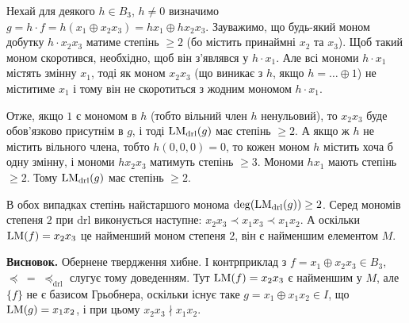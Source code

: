 Нехай для деякого $h \in B_3$, $h \neq 0$ визначимо $g = h \cdot f = h(x_1 \oplus x_2 x_3) = h x_1 \oplus h x_2 x_3$. 
Зауважимо, що будь-який моном добутку $h \cdot x_2 x_3$ матиме степінь $\geq 2$ (бо містить принаймні $x_2$ та $x_3$). 
Щоб такий моном скоротився, необхідно, щоб він з'являвся у $h \cdot x_1$. Але всі мономи $h \cdot x_1$ містять змінну 
$x_1$, тоді як моном $x_2 x_3$ (що виникає з $h$, якщо $h = \ldots \oplus 1$) не міститиме $x_1$ і тому він не 
скоротиться з жодним мономом $h \cdot x_1$.

Отже, якщо $1$ є мономом в $h$ (тобто вільний член $h$ ненульовий), то $x_2 x_3$ буде обов'язково присутнім в $g$, і 
тоді $\mathrm{LM}_{\mathrm{drl}}(g)$ має степінь $\geq 2$. А якщо ж $h$ не містить вільного члена, тобто $h(0,0,0) = 0$, то 
кожен моном $h$ містить хоча б одну змінну, і мономи $h x_{2} x_{3}$ матимуть степінь $\geq 3$. Мономи $hx_1$ мають
степінь $\geq 2$. Тому $\mathrm{LM}_{\mathrm{drl}}(g)$ має степінь $\geq 2$.

В обох випадках степінь найстаршого монома $\deg(\mathrm{LM}_{\mathrm{drl}}(g)) \geq 2$. Серед мономів степеня $2$ при drl
виконується наступне: $x_2 x_3 \prec x_1 x_3 \prec x_1 x_2$. А оскільки $\mathrm{LM}(f) = x_2 x_3$ це найменший моном степеня 
$2$, він є найменшим елементом $M$.

\noindent \textbf{Висновок.} Обернене твердження хибне. І контрприклад з $f = x_1 \oplus x_2 x_3 \in B_3$, 
$\preceq\; = \;\preceq_{\mathrm{drl}}$ слугує тому доведенням. Тут $\mathrm{LM}(f) = x_2 x_3$ є найменшим у $M$, але 
$\{f\}$ не є базисом Грьобнера, оскільки існує таке $g = x_1 \oplus x_1 x_2 \in I$, що $\mathrm{LM}(g) = x_1 x_2$, і при 
цьому $x_2 x_3 \nmid x_1 x_2$.
